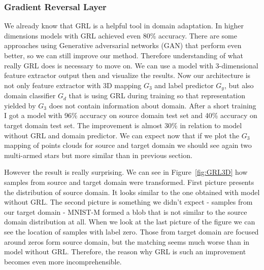 \documentclass{article}
\begin{document}
\subsubsection{Gradient Reversal Layer}
\par
We already know that GRL is a helpful tool in domain adaptation. In higher dimensions models with GRL achieved even 80\% accuracy. There are some approaches using Generative adversarial networks (GAN) that perform even better, so we can still improve our method. Therefore understanding of what really  GRL does is necessary to move on. We can use a model with 3-dimensional feature extractor output then and visualize the results. Now our architecture is not only feature extractor with 3D mapping $G_{3}$ and label predictor $G_{y}$, but also domain classifier $G_{d}$ that is using GRL during training so that representation yielded by $G_{3}$ does not contain information about domain. After a short training I got a model with 96\% accuracy on source domain test set and 40\% accuracy on target domain test set. The improvement is almost 30\% in relation to model without GRL and domain predictor. We can expect now that if we plot the $G_{3}$ mapping of points clouds for source and target domain we should see again two multi-armed stars but more similar than in previous section. 
\par
However the result is really surprising. We can see in Figure~\ref{fig:GRL3D} how samples from source and target domain were transformed. First picture presents the distribution of source domain. It looks similar to the one obtained with model without GRL. The second picture is something we didn't expect - samples from our target domain - MNIST-M formed a blob that is not similar to the source domain distribution at all. When we look at the last picture of the figure we can see the location of samples with label zero. Those from target domain are focused around zeros form source domain, but the matching seems much worse than in model without GRL. Therefore, the reason why GRL is such an improvement becomes even more incomprehensible.
\end{document}
